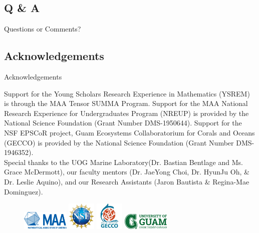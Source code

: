 \documentclass{beamer}
\begin{document}


\subsection{Q \& A}
\begin{frame}
    \begin{center}
        \Huge{Questions or Comments?}
    \end{center}
\end{frame}

\subsection{Acknowledgements}
\begin{frame}{Acknowledgements}
    \begin{center}
        Support for the Young Scholars Research Experience in Mathematics (YSREM)  is through the MAA Tensor SUMMA Program. Support for the MAA National Research Experience for Undergraduates Program (NREUP) is provided by the National Science Foundation (Grant Number DMS-1950644). Support for the NSF EPSCoR project, Guam Ecosystems Collaboratorium for Corals and Oceans (GECCO) is provided by the National Science Foundation (Grant Number DMS-1946352). \\
    \vspace{.2cm}
    \small{Special thanks to the UOG Marine Laboratory(Dr. Bastian Bentlage and Ms. Grace McDermott), our faculty mentors (Dr. JaeYong Choi, Dr. HyunJu Oh, \& Dr. Leslie Aquino), and our Research Assistants (Jaron Bautista \& Regina-Mae Dominguez).}
    
    \begin{figure}
        \includegraphics[width = 0.20\textwidth]{Figures/MAA_logo_PMS286.jpg}
        \label{MAA}
        \includegraphics[width = 0.12\textwidth]{Figures/NSF_4-Color_bitmap_Logo.png}
        \label{NSF}
        \includegraphics[width = 0.12\textwidth]{Figures/epscor.jpeg}
        \label{epscor}
        \includegraphics[width = 0.20\textwidth]{Figures/UOG-horizontal.png}
        \label{uog}
    \end{figure}
    \end{center}
\end{frame}
\end{document}

